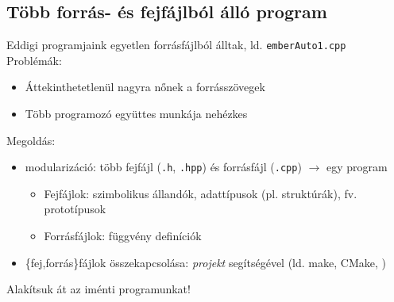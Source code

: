 \documentclass[usenames,dvipsnames,aspectratio=169]{beamer}
\begin{document}
\subsection{Több forrás- és fejfájlból álló program}
\begin{frame}
  Eddigi programjaink egyetlen forrásfájlból álltak, ld. \texttt{emberAuto1.cpp}\\
  Problémák:
  \begin{itemize}
    \item Áttekinthetetlenül nagyra nőnek a forrásszövegek
    \item Több programozó együttes munkája nehézkes
  \end{itemize}
  Megoldás:
  \begin{itemize}
    \item modularizáció: több fejfájl (\texttt{.h}, \texttt{.hpp}) és forrásfájl (\texttt{.cpp}) $\to$ egy program
    \begin{itemize}
      \item Fejfájlok: szimbolikus állandók, adattípusok (pl. struktúrák), fv. prototípusok
      \item Forrásfájlok: függvény definíciók
    \end{itemize}
    \item \{fej,forrás\}fájlok összekapcsolása: \emph{projekt} segítségével (ld. 
    make, 
    CMake,
    )
  \end{itemize}
  Alakítsuk át az iménti programunkat!
\end{frame}
\end{document}
